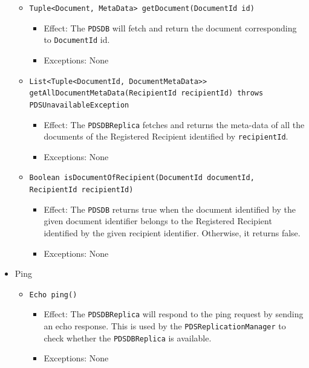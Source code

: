 \documentclass[a4paper,10pt]{article}
\begin{document}
\begin{itemize}
\begin{itemize}
    

        \item \texttt{Tuple<Document, MetaData> getDocument(DocumentId id)}
        \begin{itemize}
            \item Effect: The \texttt{PDSDB} will fetch and return the document corresponding to \texttt{DocumentId} id.
            \item Exceptions: None
         \end{itemize}
         
         
         \item \texttt{List<Tuple<DocumentId, DocumentMetaData>> getAllDocumentMetaData(RecipientId recipientId) throws PDSUnavailableException}
        \begin{itemize}
            \item Effect: The \texttt{PDSDBReplica} fetches and returns the meta-data of all the documents of the Registered Recipient identified by \texttt{recipientId}.
            \item Exceptions: None
         \end{itemize}

 		\item \texttt{Boolean isDocumentOfRecipient(DocumentId documentId, RecipientId recipientId)}
        \begin{itemize}
            \item Effect: The \texttt{PDSDB} returns true when the document identified by the given document identifier belongs to the Registered Recipient identified by the given recipient identifier. Otherwise, it returns false.
            \item Exceptions: None
		\end{itemize}           
    \end{itemize}
    
    \item Ping
    \begin{itemize}
        \item \texttt{Echo ping()}
        \begin{itemize}
            \item Effect: The \texttt{PDSDBReplica} will respond to the ping request by sending an echo response. This is used by the \texttt{PDSReplicationManager} to check whether the \texttt{PDSDBReplica} is available.
            \item Exceptions: None
        \end{itemize}
    \end{itemize}
\end{itemize}
\end{document}
